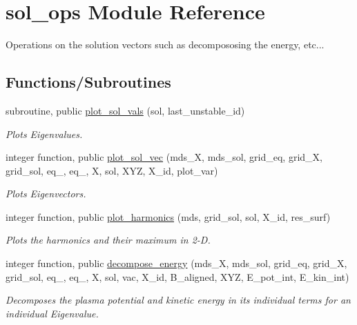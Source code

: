 \hypertarget{namespacesol__ops}{}\section{sol\+\_\+ops Module Reference}
\label{namespacesol__ops}


Operations on the solution vectors such as decompososing the energy, etc...  


\subsection*{Functions/\+Subroutines}
\begin{DoxyCompactItemize}
\item 
subroutine, public \hyperlink{namespacesol__ops_a0d4a798a56cfee9bced781d116852165}{plot\+\_\+sol\+\_\+vals} (sol, last\+\_\+unstable\+\_\+id)
\begin{DoxyCompactList}\small\item\em Plots Eigenvalues. \end{DoxyCompactList}\item 
integer function, public \hyperlink{namespacesol__ops_a13b3cf2fb6437a3c93256368fa91c267}{plot\+\_\+sol\+\_\+vec} (mds\+\_\+X, mds\+\_\+sol, grid\+\_\+eq, grid\+\_\+X, grid\+\_\+sol, eq\+\_, eq\+\_, X, sol, X\+YZ, X\+\_\+id, plot\+\_\+var)
\begin{DoxyCompactList}\small\item\em Plots Eigenvectors. \end{DoxyCompactList}\item 
integer function, public \hyperlink{namespacesol__ops_a5cec8571480fbc319e7987732fd5995c}{plot\+\_\+harmonics} (mds, grid\+\_\+sol, sol, X\+\_\+id, res\+\_\+surf)
\begin{DoxyCompactList}\small\item\em Plots the harmonics and their maximum in 2-\/D. \end{DoxyCompactList}\item 
integer function, public \hyperlink{namespacesol__ops_aee487ffbe5d0edff5e37a6500748941c}{decompose\+\_\+energy} (mds\+\_\+X, mds\+\_\+sol, grid\+\_\+eq, grid\+\_\+X, grid\+\_\+sol, eq\+\_, eq\+\_, X, sol, vac, X\+\_\+id, B\+\_\+aligned, X\+YZ, E\+\_\+pot\+\_\+int, E\+\_\+kin\+\_\+int)
\begin{DoxyCompactList}\small\item\em Decomposes the plasma potential and kinetic energy in its individual terms for an individual Eigenvalue. \end{DoxyCompactList}\item 

\end{DoxyCompactItemize}
